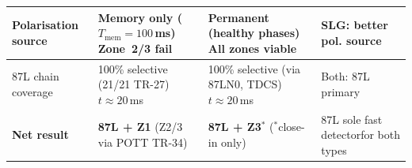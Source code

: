 \begin{tabular}{@{}L{3.0cm}|C{3.5cm}|C{3.5cm}|C{3.5cm}@{}}
\hline

Polarisation source
  & Memory only\newline
    ($T_\mathrm{mem}=100$\,ms)\newline
    Zone~2/3 fail
  & Permanent\newline
    (healthy phases)\newline
    All zones viable
  & SLG: better pol. source \\

\hline

87L chain coverage
  & 100\% selective\newline
    (21/21 TR-27)\newline
    $t\approx 20$\,ms
  & 100\% selective\newline
    (via 87LN0, TDCS)\newline
    $t\approx 20$\,ms
  & Both: 87L primary \\

\hline

\textbf{Net result}
  & \textbf{87L + Z1}\newline
    (Z2/3 via POTT TR-34)
  & \textbf{87L + Z3$^*$}\newline
    ($^*$close-in only)
  & 87L sole fast detector\newline for both types \\

\hline
\end{tabular}
